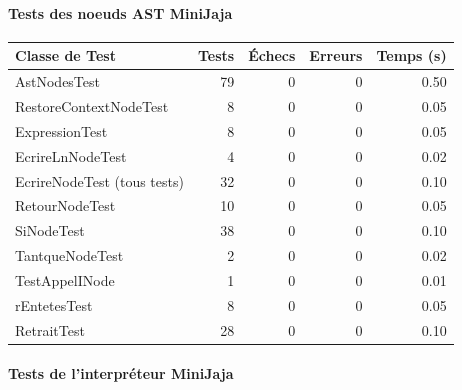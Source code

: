 \paragraph{Tests des noeuds AST MiniJaja}

\begin{center}
\small
\begin{tabular}{|l|r|r|r|r|}
\hline
\rowcolor{headerblue!20}
\textbf{Classe de Test} & \textbf{Tests} & \textbf{Échecs} & \textbf{Erreurs} & \textbf{Temps (s)} \\
\hline
\rowcolor{successgreen!20}
AstNodesTest & 79 & 0 & 0 & 0.50 \\
\hline
RestoreContextNodeTest & 8 & 0 & 0 & 0.05 \\
\hline
ExpressionTest & 8 & 0 & 0 & 0.05 \\
\hline
EcrireLnNodeTest & 4 & 0 & 0 & 0.02 \\
\hline
EcrireNodeTest (tous tests) & 32 & 0 & 0 & 0.10 \\
\hline
RetourNodeTest & 10 & 0 & 0 & 0.05 \\
\hline
SiNodeTest & 38 & 0 & 0 & 0.10 \\
\hline
TantqueNodeTest & 2 & 0 & 0 & 0.02 \\
\hline
TestAppelINode & 1 & 0 & 0 & 0.01 \\
\hline
rEntetesTest & 8 & 0 & 0 & 0.05 \\
\hline
RetraitTest & 28 & 0 & 0 & 0.10 \\
\hline
\end{tabular}
\end{center}

\paragraph{Tests de l'interpréteur MiniJaja}

